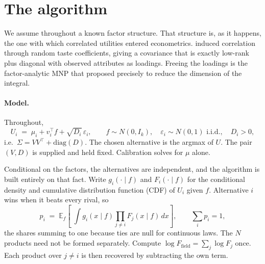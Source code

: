 \documentclass[12pt]{article}
\theoremstyle{remark}
\newcommand{\E}{\mathbb{E}}
\begin{document}
\section{The algorithm}\label{sec:algorithm}

We assume throughout a known factor structure. That structure is, as
it happens, the one with which correlated utilities entered
econometrics. \citet{hausman1978} induced correlation
through random taste coefficients, giving a covariance that is exactly
low-rank plus diagonal with observed attributes as loadings. Freeing the
loadings is the factor-analytic MNP that \citet{mcfadden1984} proposed
precisely to reduce the dimension of the integral. 

\paragraph{Model.} Throughout,
\begin{equation}
U_i \;=\; \mu_i + v_i^\top f + \sqrt{D_i}\,\varepsilon_i,
\qquad f \sim N(0, I_k), \quad \varepsilon_i \sim N(0,1) \text{ i.i.d.},
\quad D_i > 0,
\label{eq:model}
\end{equation}
i.e.\ $\Sigma = VV^\top + \mathrm{diag}(D)$. The chosen alternative is the
argmax of $U$. The pair $(V, D)$ is supplied and held fixed.
Calibration solves for $\mu$ alone.

Conditional on the factors, the alternatives are independent, and the
algorithm is built entirely on that fact. Write $g_i(\cdot \mid f)$ and
$F_i(\cdot \mid f)$ for the conditional density and cumulative distribution function (CDF) of $U_i$ given
$f$. Alternative $i$ wins when it beats every rival, so
\begin{equation}
p_i \;=\; \E_f\!\left[\;\int g_i(x \mid f)
\prod_{j \neq i} F_j(x \mid f)\, dx \right],
\qquad \sum_i p_i = 1,
\label{eq:forward}
\end{equation}
the shares summing to one because ties are null for continuous laws.
The $N$ products need not be formed
separately. Compute $\log F_{\mathrm{field}} = \sum_j \log F_j$ once.
Each product over $j \ne i$ is then recovered by subtracting the own
term.
\end{document}
